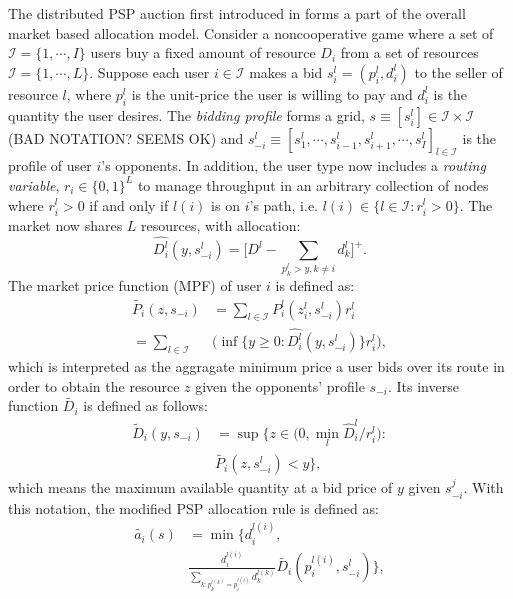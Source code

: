 \documentclass[12pt]{article}
\theoremstyle{definition}
\newcommand{\mcI}{\mathcal{I}}
\begin{document}
\begin{multicols}{2}
The distributed PSP auction first introduced in \cite{lazar} forms a part of the
overall market based allocation model. Consider a noncooperative game
where a set of $\mcI = \lbrace 1,\cdots,I\rbrace$ users buy a fixed
amount of resource $D_i$ from a set of resources $\mcI = \lbrace 1,\cdots,L\rbrace$. Suppose
each user $i \in \mcI$ makes a bid $s_i^l = (p_i^l, d_i^l)$ to the
seller of resource $l$,
where $p_i^l$ is the unit-price the user is willing to pay and $d_i^l$ is the
quantity the user desires. The \emph{bidding profile} forms a grid, $s \equiv
[s_i^l] \in \mcI \times \mcI$ (BAD NOTATION?
SEEMS OK)  and $s_{−i}^l \equiv [s_1^l , \cdots , s_{i−1}^l , s_{i+1}^l , \cdots
, s_I^l]_{l\in\mcI}$ is
the profile of user $i$’s opponents. In addition, the user type now includes a
\emph{routing variable}, $r_i\in\lbrace 0, 1\rbrace^L$ to manage throughput in
an arbitrary collection of nodes where $r_i^l >0$ if and only if $l(i)$ is on
$i$'s path, i.e. $l(i) \in \lbrace l\in \mcI : r_i^l >0\rbrace$. 
The market now shares $L$ resources, with allocation:
$$
    \hat{D_i^l}(y,s_{-i}^l) = \bigg\lbrack D^l -
\displaystyle\sum_{p_k^l > y, k\ne i} d_k^l\bigg\rbrack^+.
$$
The market price function (MPF) of user $i$ is defined as:
\begin{align*}
    \tilde{P_i}(z, s_{-i}) &= \displaystyle\sum_{l\in\mcI}P_i^l(z_i^l,
s_{-i}^l)r_i^l \\
    = \displaystyle\sum_{l\in\mcI}&\bigg(\inf\bigg\lbrace y\ge 0 :
\hat{D_i^l}(y,s_{-i}^l)\bigg\rbrace r_i^l\bigg),
\end{align*}
which is interpreted as the aggragate minimum price a user bids over its route in order to obtain the
resource $z$ given the opponents’ profile $s_{−i}$. Its inverse function
$\tilde{D_i}$ is defined as follows:
\begin{align*}
    \tilde{D}_i(y, s_{-i}) &= \sup\bigg\lbrace z\in \bigg( 0,
\min_l\hat{D}_i^l/r_i^l\bigg) : \\
    &\tilde{P_i}(z,s_{-i}^l) < y\bigg\rbrace,
\end{align*}
which means the maximum available quantity at a bid price of $y$ given
$s_{−i}^j$. With this notation, the modified PSP allocation rule \cite{tuffin} is defined
as:
\begin{align*}
    \tilde{a_i}(s) &= \min\big\lbrace d_i^{l(i)}, \\
 &\frac{d_i^{l(i)}}{\sum_{k:p_k^{l(k)}=p_i^{l(i)}}d_k^{l(k)}} \tilde{D_i}(p_i^{l(i)},
s_{-i}^l)\big\rbrace,
\end{align*}

\end{multicols}
\end{document}
